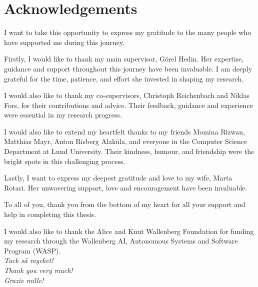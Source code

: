 \chapter{Acknowledgements}
\label{chap:acknowledgements}
I want to take this opportunity to express my gratitude to the many people who 
have supported me during this journey. 

Firstly, I would like to thank my main supervisor, 
G\"{o}rel Hedin. Her expertise, guidance and support throughout this journey have been invaluable.
I am deeply grateful for the time, patience, and effort she invested in shaping my research.

I would also like to thank my co-supervisors, Christoph Reichenbach and Niklas Fors,
for their contributions and advice. Their feedback, guidance and experience were essential 
in my research progress.

I would also like to extend my heartfelt thanks to my friends Momina Rizwan, 
Matthias Mayr, Anton Risberg Alak\"{u}la, and everyone in the Computer Science 
Department at Lund University. Their kindness, humour, and friendship were the 
bright spots in this challenging process.

Lastly, I want to express my deepest gratitude and love to my wife, Marta Rotari. 
Her unwavering support, love and encouragement have been invaluable. 

To all of you, thank you from the bottom of my heart for all your support and help
in completing this thesis.

I would also like to thank the Alice and Knut Wallenberg Foundation for funding my 
research through the Wallenberg AI, Autonomous Systems and Software Program (WASP).\\[5pt]


\hfill \emph{Tack s\r{a} mycket!}\\

\hfill \emph{Thank you very much!}\\

\hfill \emph{Grazie mille!}\\